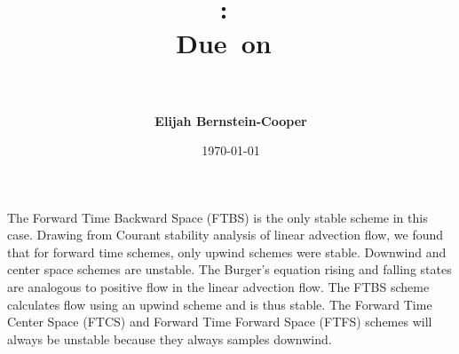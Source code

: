\documentclass{article}
\title{\vspace{2in}
    \textmd{\textbf{\hmwkClass:\ \hmwkTitle}}\\
    \normalsize\vspace{0.1in}\small{Due\ on\ \hmwkDueDate}\\
    \vspace{0.1in}\large{\textit{\hmwkClassInstructor\ \hmwkClassTime}}
    \vspace{3in}}
\author{\textbf{Elijah Bernstein-Cooper}}
\date{\today} %
\begin{document}
\maketitle
\newpage

\begin{homeworkProblem}

    The Forward Time Backward Space (FTBS) is the only stable scheme in this
    case. Drawing from Courant stability analysis of linear advection flow, we
    found that for forward time schemes, only upwind schemes were stable.
    Downwind and center space schemes are unstable. The Burger's equation
    rising and falling states are analogous to positive flow in the linear
    advection flow. The FTBS scheme calculates flow using an upwind scheme and
    is thus stable. The Forward Time Center Space (FTCS) and Forward Time
    Forward Space (FTFS) schemes will always be unstable because they always
    samples downwind.

\end{homeworkProblem}
\clearpage
\end{document}
